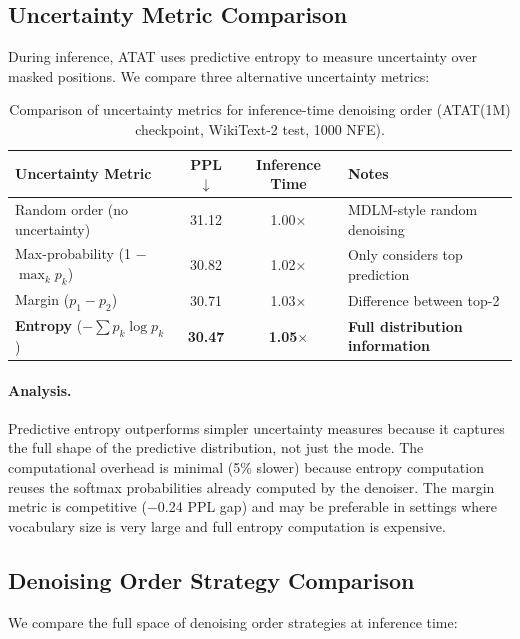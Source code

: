 \subsection{Uncertainty Metric Comparison}

During inference, ATAT uses predictive entropy to measure uncertainty over masked positions. We compare three alternative uncertainty metrics:

\begin{table}[h]
\centering
\caption{Comparison of uncertainty metrics for inference-time denoising order (ATAT(1M) checkpoint, WikiText-2 test, 1000 NFE).}
\label{tab:uncertainty-comparison}
\begin{tabular}{lccl}
\toprule
\textbf{Uncertainty Metric} & \textbf{PPL} $\downarrow$ & \textbf{Inference Time} & \textbf{Notes} \\
\midrule
Random order (no uncertainty) & 31.12 & 1.00$\times$ & MDLM-style random denoising \\
Max-probability (1 $-$ $\max_k p_k$) & 30.82 & 1.02$\times$ & Only considers top prediction \\
Margin ($p_1 - p_2$) & 30.71 & 1.03$\times$ & Difference between top-2 \\
\textbf{Entropy} ($-\sum p_k \log p_k$) & \textbf{30.47} & \textbf{1.05$\times$} & \textbf{Full distribution information} \\
\bottomrule
\end{tabular}
\end{table}

\paragraph{Analysis.} Predictive entropy outperforms simpler uncertainty measures because it captures the full shape of the predictive distribution, not just the mode. The computational overhead is minimal (5\% slower) because entropy computation reuses the softmax probabilities already computed by the denoiser. The margin metric is competitive ($-$0.24 PPL gap) and may be preferable in settings where vocabulary size is very large and full entropy computation is expensive.

\subsection{Denoising Order Strategy Comparison}

We compare the full space of denoising order strategies at inference time:


